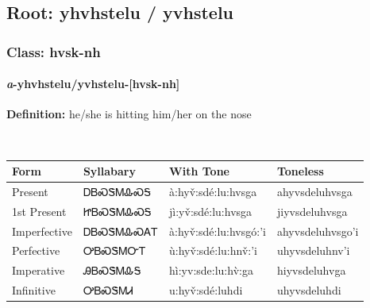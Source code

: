 \needspace{4in}
\subsection*{Root: yhvhstelu / yvhstelu}
\nopagebreak
{}
\needspace{3in}
\subsubsection*{Class: hvsk-nh}
\nopagebreak
\needspace{2in}
\paragraph*{\textit{a}{-}\textbf{yhvhstelu/yvhstelu}{-}[hvsk-nh]}
\nopagebreak
\textbf{Definition: } he/she is hitting him/her on the nose
\\[0.5em]
\begin{tabularx}{\textwidth}{l X X X}%
\toprule%
\textbf{Form}&\textbf{Syllabary}&\textbf{With Tone}&\textbf{Toneless}\\%
\midrule%
Present&ᎠᏴᏍᏕᎷᎲᏍᎦ&à:hyv̌:sdé:lu:hvsga&ahyvsdeluhvsga\\%
1st Present&ᏥᏴᏍᏕᎷᎲᏍᎦ&jì:yv̌:sdé:lu:hvsga&jiyvsdeluhvsga\\%
Imperfective&ᎠᏴᏍᏕᎷᎲᏍᎪᎢ&à:hyv̌:sdé:lu:hvsgó:’i&ahyvsdeluhvsgo’i\\%
Perfective&ᎤᏴᏍᏕᎷᏅᎢ&ù:hyv̌:sdé:lu:hnv̌:’i&uhyvsdeluhnv’i\\%
Imperative&ᎯᏴᏍᏕᎷᎲᎦ&hì:yv:sde:lu:hv̀:ga&hiyvsdeluhvga\\%
Infinitive&ᎤᏴᏍᏕᎷᏗ&u:hyv̌:sdé:luhdi&uhyvsdeluhdi\\%
\bottomrule%
\end{tabularx}
\\[1em]